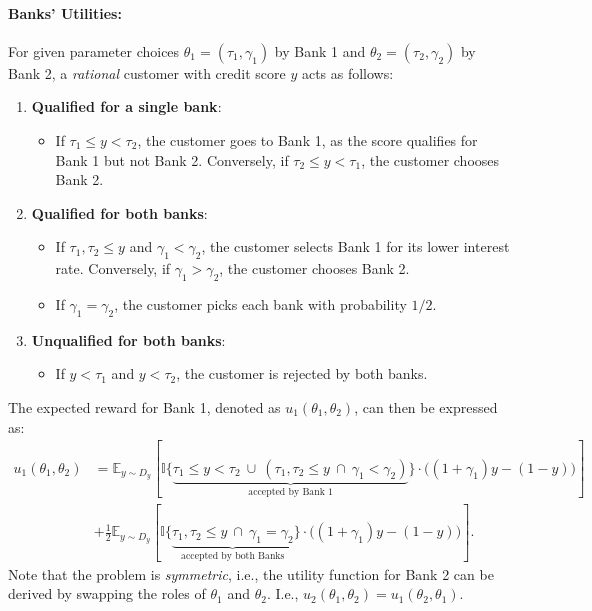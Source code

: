 
\paragraph{Banks' Utilities:} For given parameter choices \(\theta_1 = (\tau_1, \gamma_1)\) by Bank 1 and \(\theta_2 = (\tau_2, \gamma_2)\) by Bank 2, a \emph{rational} customer with credit score $y$ acts as follows:

\begin{enumerate}
    \item \textbf{Qualified for a single bank}: 
        \begin{itemize}
        \item If \(\tau_1 \leq y < \tau_2\), the customer goes to Bank 1, as the score qualifies for Bank 1 but not Bank 2. Conversely, if \(\tau_2 \leq y < \tau_1\), the customer chooses Bank 2.
    \end{itemize}
    \item \textbf{Qualified for both banks}:
     \begin{itemize}
        \item If \(\tau_1, \tau_2 \leq y\) and \(\gamma_1 < \gamma_2\), the customer selects Bank 1 for its lower interest rate. Conversely, if \(\gamma_1 > \gamma_2\), the customer chooses Bank 2.
        \item If \(\gamma_1 = \gamma_2\), the customer picks each bank with probability $1/2$. 
    \end{itemize}
    \item \textbf{Unqualified for both banks}:
    \begin{itemize}
        \item If \(y < \tau_1\) and \(y < \tau_2\), the customer is rejected by both banks.
    \end{itemize}
\end{enumerate}

The expected reward for Bank 1, denoted as \(u_1(\theta_1, \theta_2)\), can then be expressed as:
\begin{align}\label{eq:utility}
    u_1(\theta_1, \theta_2) 
    &=  \mathbb{E}_{y \sim D_y} \left[ \mathbb{I}\{\underbrace{\tau_1 \leq y < \tau_2 \ \cup \ (\tau_1, \tau_2 \leq y \ \cap \ \gamma_1 < \gamma_2)}_{\text{accepted by Bank 1}}\} \cdot \big((1+\gamma_1)y - (1-y)\big) \right] \nonumber\\
    & + \frac{1}{2} \mathbb{E}_{y \sim D_y} \left[ \mathbb{I}\{\underbrace{\tau_1, \tau_2 \leq y \ \cap \ \gamma_1 = \gamma_2}_{\text{accepted by both Banks}}\} \cdot \big((1+\gamma_1)y - (1-y)\big) \right].
\end{align}
Note that the problem is \emph{symmetric}, i.e., the utility function for Bank 2 can be derived by swapping the roles of \(\theta_1\) and \(\theta_2\). I.e., $u_2(\theta_1, \theta_2) = u_1(\theta_2, \theta_1)$. 

